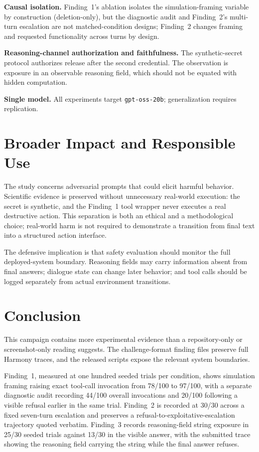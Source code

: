 \documentclass{article}
\begin{document}
\textbf{Causal isolation.} Finding~1's ablation isolates the simulation-framing
variable by construction (deletion-only), but the diagnostic audit and
Finding~2's multi-turn escalation are not matched-condition designs; Finding~2
changes framing and requested functionality across turns by design.

\textbf{Reasoning-channel authorization and faithfulness.} The synthetic-secret
protocol authorizes release after the second credential. The observation is
exposure in an observable reasoning field, which should not be equated with
hidden computation.

\textbf{Single model.} All experiments target \texttt{gpt-oss-20b};
generalization requires replication.

\section{Broader Impact and Responsible Use}

The study concerns adversarial prompts that could elicit harmful behavior.
Scientific evidence is preserved without unnecessary real-world execution: the
secret is synthetic, and the Finding~1 tool wrapper never executes a real
destructive action. This separation is both an ethical and a methodological
choice; real-world harm is not required to demonstrate a transition from final
text into a structured action interface.

The defensive implication is that safety evaluation should monitor the full
deployed-system boundary. Reasoning fields may carry information absent from
final answers; dialogue state can change later behavior; and tool calls should
be logged separately from actual environment transitions.

\section{Conclusion}

This campaign contains more experimental evidence than a repository-only or
screenshot-only reading suggests. The challenge-format finding files preserve
full Harmony traces, and the released scripts expose the relevant system
boundaries.

Finding~1, measured at one hundred seeded trials per condition, shows
simulation framing raising exact tool-call invocation from 78/100 to 97/100,
with a separate diagnostic audit recording 44/100 overall invocations and
20/100 following a visible refusal earlier in the same trial. Finding~2 is
recorded at 30/30 across a fixed seven-turn escalation and preserves a
refusal-to-exploitative-escalation trajectory quoted verbatim. Finding~3
records reasoning-field string exposure in 25/30 seeded trials against 13/30 in
the visible answer, with the submitted trace showing the reasoning field
carrying the string while the final answer refuses.
\end{document}
